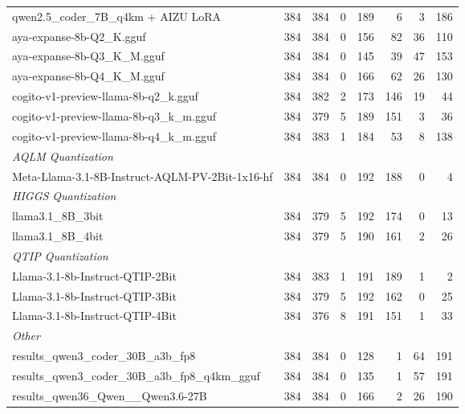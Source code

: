 \begin{table}[htbp]
{\begin{tabular}{lrrrrrrr}
    qwen2.5\_coder\_7B\_q4km + AIZU LoRA & 384 & 384 & 0 & 189 & 6 & 3 & 186 \\
    aya-expanse-8b-Q2\_K.gguf & 384 & 384 & 0 & 156 & 82 & 36 & 110 \\
    aya-expanse-8b-Q3\_K\_M.gguf & 384 & 384 & 0 & 145 & 39 & 47 & 153 \\
    aya-expanse-8b-Q4\_K\_M.gguf & 384 & 384 & 0 & 166 & 62 & 26 & 130 \\
    cogito-v1-preview-llama-8b-q2\_k.gguf & 384 & 382 & 2 & 173 & 146 & 19 & 44 \\
    cogito-v1-preview-llama-8b-q3\_k\_m.gguf & 384 & 379 & 5 & 189 & 151 & 3 & 36 \\
    cogito-v1-preview-llama-8b-q4\_k\_m.gguf & 384 & 383 & 1 & 184 & 53 & 8 & 138 \\
    \midrule
    \multicolumn{8}{l}{\textit{AQLM Quantization}} \\
    \midrule
    Meta-Llama-3.1-8B-Instruct-AQLM-PV-2Bit-1x16-hf & 384 & 384 & 0 & 192 & 188 & 0 & 4 \\
    \midrule
    \multicolumn{8}{l}{\textit{HIGGS Quantization}} \\
    \midrule
    llama3.1\_8B\_3bit & 384 & 379 & 5 & 192 & 174 & 0 & 13 \\
    llama3.1\_8B\_4bit & 384 & 379 & 5 & 190 & 161 & 2 & 26 \\
    \midrule
    \multicolumn{8}{l}{\textit{QTIP Quantization}} \\
    \midrule
    Llama-3.1-8b-Instruct-QTIP-2Bit & 384 & 383 & 1 & 191 & 189 & 1 & 2 \\
    Llama-3.1-8b-Instruct-QTIP-3Bit & 384 & 379 & 5 & 192 & 162 & 0 & 25 \\
    Llama-3.1-8b-Instruct-QTIP-4Bit & 384 & 376 & 8 & 191 & 151 & 1 & 33 \\
    \midrule
    \multicolumn{8}{l}{\textit{Other}} \\
    \midrule
    results\_qwen3\_coder\_30B\_a3b\_fp8 & 384 & 384 & 0 & 128 & 1 & 64 & 191 \\
    results\_qwen3\_coder\_30B\_a3b\_fp8\_q4km\_gguf & 384 & 384 & 0 & 135 & 1 & 57 & 191 \\
    results\_qwen36\_Qwen\_\_Qwen3.6-27B & 384 & 384 & 0 & 166 & 2 & 26 & 190 \\
    \bottomrule
  \end{tabular}
  }
\end{table}

